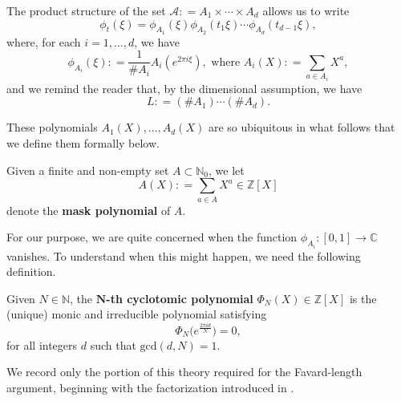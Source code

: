 \documentclass[12pt]{amsart}
\numberwithin{equation}{section}
\begin{document}
The product structure of the set $\mathcal{A} : = A_1 \times \cdots \times A_d$ allows us to write
\begin{equation}\label{eq:phit}
\phi_t (\xi) = \phi_{A_1} (\xi) \phi_{A_2} (t_1 \xi) \cdots \phi_{A_d} (t_{d-1} \xi),
\end{equation}
where, for each $i=1,...,d$, we have
\begin{equation}\label{eq:phifirsttime}
 \phi_{A_i} (\xi) : = \frac{1}{\# A_i} A_i (e^{2\pi i \xi}) , \textrm{ where } A_i (X) : = \sum_{a \in A_i} X^a,
\end{equation}
and we remind the reader that, by the dimensional assumption, we have
$$
L : = (\#A_1) \cdots (\#A_d).
$$


These polynomials $A_1 (X),...,A_d (X)$ are so ubiquitous in what follows that we define them formally below.


\medskip

\begin{definition}
Given a finite and non-empty set $A \subset \mathbb{N}_0$, we let
$$
A(X) : = \sum\limits_{a \in A} X^a \in \mathbb{Z}[X]
$$
denote the \textbf{mask polynomial} of $A$.
\end{definition}

\medskip

For our purpose, we are quite concerned when the function $\phi_{A_i} : [0,1] \rightarrow \mathbb{C}$ vanishes. To understand when this might happen, we need the following definition.


\begin{definition}
Given $N \in \mathbb{N}$, the \textbf{$\bm{N}$-th cyclotomic polynomial} $\Phi_N (X) \in \mathbb{Z}[X]$ is the (unique) monic and irreducible polynomial satisfying
$$
\Phi_N \big(e^{\frac{2 \pi i d}{N}} \big) = 0,
$$
for all integers $d$ such that $\textrm{gcd}(d,N) = 1$.
\end{definition}

We record only the portion of this theory required for the Favard-length argument, beginning with the factorization introduced in \cite{BLV}.

\medskip
\end{document}
